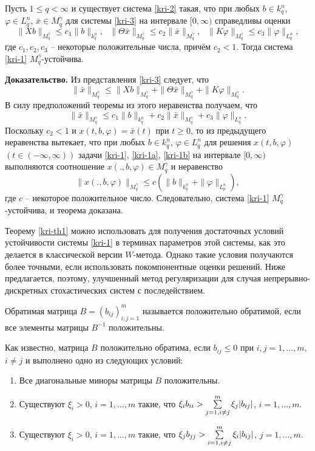 \begin{theorem}\label{kri-th1}Пусть $1\le q < \infty $ и существует
система \eqref{kri-2} такая, что при любых $b \in k^n_q$, $\varphi \in L^n_q$,
$\bar x \in M_q^\gamma $ для системы \eqref{kri-3} на интервале $[0, \infty)$
справедливы оценки
$$
\| Xb\|_{M_q^\gamma} \le c_1\|b\|_{k_q^n}, \ \ \ \|\Theta \bar
x\|_{M_q^\gamma} \le c_2\|\bar x\|_{M_q^\gamma}, \ \ \  \|K\varphi
\|_{M_q^\gamma} \le c_3  \|\varphi \|_{L^n_q},
$$
где $c_1, c_2, c_3$ -- некоторые положительные числа, причём $c_2 <
1$. Тогда система \eqref{kri-1} $M_q^\gamma$-устойчива.
\end{theorem}

\textbf{ Доказательство.} Из представления \eqref{kri-3} следует, что
$$
\| \bar x\|_{M_q^\gamma} \le \| Xb\|_{M_q^\gamma} + \|\Theta \bar
x\|_{M_q^\gamma} +  \|K\varphi \|_{M_q^\gamma}.
 $$
В силу предположений теоремы из этого неравенства получаем, что
$$
\|\bar x\|_{M_q^\gamma} \le c_1\|b\|_{k^n_q} + c_2\|\bar
x\|_{M_q^\gamma} + c_3\|\varphi \|_{L^n_q}.
$$
Поскольку $c_2 <1$ и $x(t,b,\varphi) = \bar x(t)$  при $t \geq 0$,
то из предыдущего неравенства вытекает, что при любых $b \in k^n_q$,
$\varphi \in L^n_q$ для решения $x(t, b, \varphi)$ $(t \in (-\infty,
\infty ))$ задачи \eqref{kri-1}, \eqref{kri-1a}, \eqref{kri-1b} на интервале $[0, \infty)$
выполняются соотношение $x(., b, \varphi) \in M_q^\gamma$ и
неравенство
$$
\|x(., b, \varphi)\|_{M_q^\gamma} \le c\left(\|b\|_{k^n_q} +
\|\varphi \|_{L^n_p}\right),
$$
где $c$ -- некоторое положительное число. Следовательно,  система
\eqref{kri-1} $M_q^\gamma$-устойчива, и теорема доказана.

Теорему \ref{kri-th1} можно использовать для получения достаточных условий
устойчивости системы \eqref{kri-1} в терминах параметров этой системы, как это
делается в классической версии $W$-метода. Однако такие условия
получаются более точными, если использовать покомпонентные оценки
решений. Ниже предлагается, поэтому, улучшенный метод регуляризации
для случая непрерывно-дискретных стохастических систем с
последействием.

\begin{definition}\label{kri-def4} Обратимая матрица $B = (b_{ij})^m_{i,j=1}$
называется положительно обратимой, если все элементы матрицы
$B^{-1}$ положительны.
\end{definition}

Как известно, матрица $B$ положительно обратима, если $b_{ij} \leq
0$ при $i, j = 1,\dots,m$, $i\neq j$ и выполнено одно из следующих
условий:
\begin{enumerate}
  \item  Все диагональные миноры матрицы $B$ положительны.
  \item Существуют
$\xi _i>0$, $i = 1,\dots,m$ такие, что $\xi_i b_{ii} > \sum \limits
_{j=1\\, i \neq j}^m\xi_j |b_{ij}|$, $i = 1,\dots,m$.
  \item Существуют
$\xi _i>0$, $i = 1,\dots,m$ такие, что $\xi_j b_{jj} > \sum \limits
_{i=1\\, i \neq j}^m\xi_i |b_{ij}|$, $j = 1,\dots,m$.
\end{enumerate}

